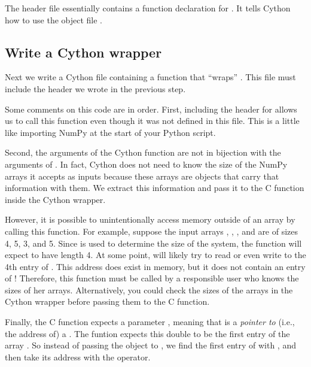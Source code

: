 The header file essentially contains a function declaration for .
It tells Cython how to use the object file .


\subsection*{Write a Cython wrapper}
Next we write a Cython file containing a function that ``wraps'' .
This file must include the header we wrote in the previous step.



Some comments on this code are in order. 
First, including the header for  allows us to call this function even though it was not defined in this file.
This is a little like importing NumPy at the start of your Python script.

Second, the arguments of the Cython function  are not in bijection with the arguments of .
In fact, Cython does not need to know the size of the NumPy arrays it accepts as inputs because these arrays are objects that carry that information with them.
We extract this information and pass it to the C function inside the Cython wrapper.

However, it is possible to unintentionally access memory outside of an array by calling this function.
For example, suppose the input arrays , , , and  are of sizes 4, 5, 3, and 5.
Since  is used to determine the size of the system, the function  will expect  to have length 4.
At some point,  will likely try to read or even write to the 4th entry of .
This address does exist in memory, but it does not contain an entry of !
Therefore, this function must be called by a responsible user who knows the sizes of her arrays.
Alternatively, you could check the sizes of the arrays in the Cython wrapper before passing them to the C function.

Finally, the C function expects a parameter , meaning that  is a \emph{pointer to} (i.e., the address of) a .
The funtion  expects this double to be the first entry of the array .
So instead of passing the object  to , we find the first entry of  with , and then take its address with the \li{&} operator.





